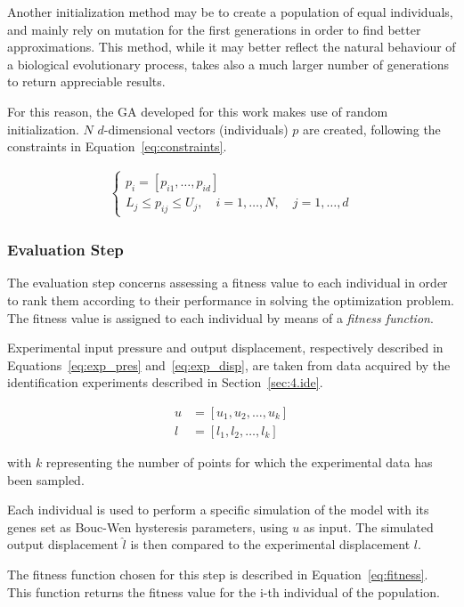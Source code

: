 Another initialization method may be to create a population of equal
individuals, and mainly rely on mutation for the first generations
in order to find better approximations. This method, while it may better
reflect the natural behaviour of a biological evolutionary process,
takes also a much larger number of generations to return appreciable results.

For this reason, the GA developed for this work makes use of random initialization.
$N$ $d$-dimensional vectors (individuals) $p$ are created,
following the constraints in Equation~\ref{eq:constraints}.

\begin{align}
\begin{cases}
	p_i = \left[p_{i1},\ldots,p_{id}\right] \\
	L_j \leq p_{ij} \leq U_j, \quad i=1,\ldots,N, \quad j=1,\ldots,d
\end{cases}
\label{eq:constraints}
\end{align}


\subsubsection{Evaluation Step}

The evaluation step concerns assessing a fitness value to each individual
in order to rank them according to their performance in solving the optimization problem.
The fitness value is assigned to each individual by means of a \textit{fitness function}.

Experimental input pressure and output displacement,
respectively described in Equations~\ref{eq:exp_pres} and~\ref{eq:exp_disp},
are taken from data acquired by the identification experiments described
in Section~\ref{sec:4.ide}. 

\begin{align}
u &= \left[u_1,u_2,\ldots,u_k\right] \label{eq:exp_pres} \\
l &= \left[l_1,l_2,\ldots,l_k\right] \label{eq:exp_disp}
\end{align}

with $k$ representing the number of points for which the experimental data
has been sampled.

Each individual is used to perform a specific simulation of the model with its genes
set as Bouc-Wen hysteresis parameters, using $u$ as input.
The simulated output displacement $\hat{l}$
is then compared to the experimental displacement $l$.

The fitness function chosen for this step is described in Equation~\ref{eq:fitness}.
This function returns the fitness value for the i-th individual of the population.

